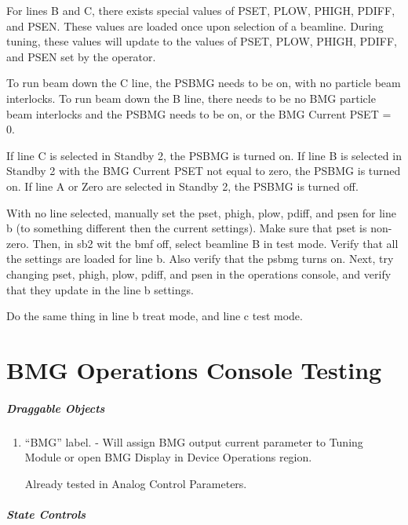 \documentclass[11pt]{book}		%
\begin{document}
For lines B and C, there exists special values of PSET, PLOW, PHIGH, PDIFF, and PSEN. These values are loaded once upon selection of a beamline. During tuning, these values will update to the values of PSET, PLOW, PHIGH, PDIFF, and PSEN set by the operator.

To run beam down the C line, the PSBMG needs to be on, with no particle beam interlocks. To run beam down the B line, there needs to be no BMG particle beam interlocks and the PSBMG needs to be on, or the BMG Current PSET = 0.

If line C is selected in Standby 2, the PSBMG is turned on. If line B is selected in Standby 2 with the BMG Current PSET not equal to zero, the PSBMG is turned on. If line A or Zero are selected in Standby 2, the PSBMG is turned off.

\color{red}

With no line selected, manually set the pset, phigh, plow, pdiff, and psen for line b (to something different then the current settings). Make sure that pset is non-zero. Then, in sb2 wit the bmf off, select beamline B in test mode. Verify that all the settings are loaded for line b. Also verify that the psbmg turns on. Next, try changing pset, phigh, plow, pdiff, and psen in the operations console, and verify that they update in the line b settings.

Do the same thing in line b treat mode, and line c test mode.

\color{black}






\chapter{BMG Operations Console Testing}

\paragraph{Draggable Objects}

\begin{enumerate}
 \item ``BMG'' label. - Will assign BMG output current parameter to Tuning Module or open BMG Display in Device Operations region.

\color{red}
Already tested in Analog Control Parameters.
\color{black}

\end{enumerate}

\paragraph{State Controls}
\end{document}
